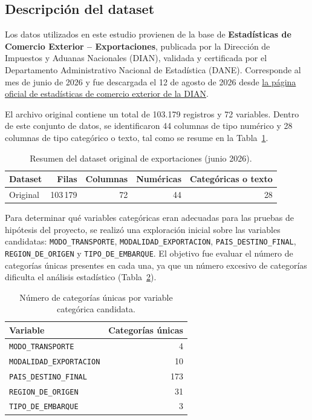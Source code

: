 \documentclass[12pt]{article}
\begin{document}
\subsection*{Descripción del dataset}

Los datos utilizados en este estudio provienen de la base de
\textbf{Estadísticas de Comercio Exterior -- Exportaciones}, publicada
por la Dirección de Impuestos y Aduanas Nacionales (DIAN), validada y
certificada por el Departamento Administrativo Nacional de Estadística
(DANE). Corresponde al mes de junio de 2026 y fue descargada el 12 de
agosto de 2026 desde
\href{https://www.dian.gov.co/dian/cifras/Paginas/Bases-Estadisticas-de-Comercio-Exterior-Importaciones-y-Exportaciones.aspx}{la página oficial de estadísticas de comercio exterior de la DIAN}.

El archivo original contiene un total de 103.179 registros y 72 variables.
Dentro de este conjunto de datos, se identificaron 44 columnas de tipo numérico y 28 columnas de tipo categórico o texto, tal como se resume en la Tabla~\ref{tab:resumen_original}.

\begin{table}[htbp]
    \centering
    \caption{Resumen del dataset original de exportaciones (junio 2026).}
    \label{tab:resumen_original}
    \begin{tabular}{lrrrr}
        \toprule
        Dataset & Filas & Columnas & Numéricas & Categóricas o texto \\
        \midrule
        Original & 103\,179 & 72 & 44 & 28 \\
        \bottomrule
    \end{tabular}
\end{table}
\FloatBarrier

Para determinar qué variables categóricas eran adecuadas para las
pruebas de hipótesis del proyecto, se realizó una exploración inicial
sobre las variables candidatas: \texttt{MODO\_TRANSPORTE},
\texttt{MODALIDAD\_EXPORTACION}, \texttt{PAIS\_DESTINO\_FINAL},
\texttt{REGION\_DE\_ORIGEN} y \texttt{TIPO\_DE\_EMBARQUE}. El objetivo
fue evaluar el número de categorías únicas presentes en cada una, ya que
un número excesivo de categorías dificulta el análisis estadístico
(Tabla~\ref{tab:categoricas}).

\begin{table}[htbp]
    \centering
    \caption{Número de categorías únicas por variable categórica candidata.}
    \label{tab:categoricas}
    \begin{tabular}{lr}
        \toprule
        Variable & Categorías únicas \\
        \midrule
        \texttt{MODO\_TRANSPORTE} & 4 \\
        \texttt{MODALIDAD\_EXPORTACION} & 10 \\
        \texttt{PAIS\_DESTINO\_FINAL} & 173 \\
        \texttt{REGION\_DE\_ORIGEN} & 31 \\
        \texttt{TIPO\_DE\_EMBARQUE} & 3 \\
        \bottomrule
    \end{tabular}
\end{table}
\FloatBarrier
\end{document}
